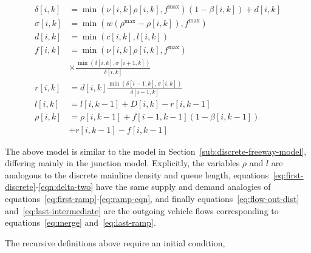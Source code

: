 \begin{align}
\delta\left[i,k\right] & = \min\left(\nu\left[i,k\right]\rho\left[i,k\right], f^{\max}\right)\left(1 - \beta\left[i,k\right]\right) + d\left[i,k\right] \label{eq:delta-two}\\
  \sigma\left[i,k\right] & = \min\left(w \left(\rho^{\max} - \rho\left[i, k\right]\right), f^{\max}\right) \\
  d\left[i,k\right] & = \min\left(c\left[i,k\right], l\left[i,k\right]\right) \label{eq:first-discrete} \\
  f\left[i,k\right] & = \min\left(\nu\left[i,k\right]\rho\left[i,k\right], f^{\max}\right) \\
  & \times \frac{\min\left(\delta\left[i,k\right], \sigma\left[i+1,k\right]\right)}{\delta\left[i,k\right]} \nonumber \label{eq:flow-out-dist} \\
  r\left[i,k\right] &= d\left[i,k\right] \frac{\min\left(\delta\left[i-1,k\right], \sigma\left[i,k\right]\right)}{\delta\left[i-1,k\right]} \label{eq:last-intermediate} \\
  l\left[i,k\right] &= l\left[i,k-1\right] + D\left[i,k\right] - r\left[i,k-1\right] \label{eq:first-explicit}\\
  \rho\left[i,k\right] &= \rho\left[i,k-1\right] + f\left[i-1, k-1\right] (1 - \beta\left[i,k-1\right]) \label{eq:last-discrete} \\
  & + r\left[i,k-1\right] - f\left[i,k-1\right] \nonumber
\end{align}

The above model is similar to the model in Section~\ref{sub:discrete-freeway-model}, differing mainly in the junction model. Explicitly, the variables $\rho$ and $l$ are analogous to the discrete mainline density and queue length, equations~\eqref{eq:first-discrete}-\eqref{eqn:delta-two} have the same supply and demand analogies of equations~\eqref{eq:first-ramp}-\eqref{eq:ramp-eqn}, and finally equations~\eqref{eq:flow-out-dist} and~\eqref{eq:last-intermediate} are the outgoing vehicle flows corresponding to equations~\eqref{eq:merge} and~\eqref{eq:last-ramp}.

The recursive definitions above require an initial condition,

